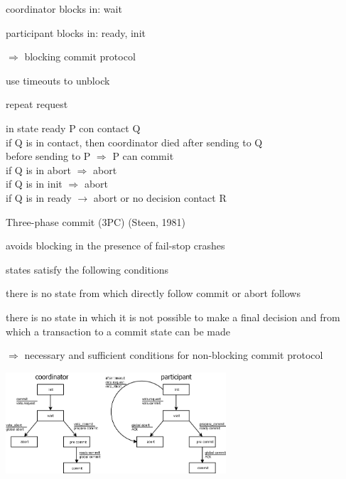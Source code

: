 \begin{compactitem}
\begin{compactitem}
	\begin{compactitem}
		\item coordinator blocks in: wait
		\item participant blocks in: ready, init
	\end{compactitem}
	$\Rightarrow$ blocking commit protocol
	\item use timeouts to unblock
	\item repeat request
	\item in state ready P con contact Q\\
	if Q is in contact, then coordinator died after sending to Q\\
	before sending to P $\Rightarrow$ P can commit\\
	if Q is in abort $\Rightarrow$ abort\\
	if Q is in init $\Rightarrow$ abort\\
	if Q is in ready $\rightarrow$ abort or no decision contact R\\
	\end{compactitem}
	\item Three-phase commit (3PC) (Steen, 1981)\\
	\begin{compactitem}
		\item avoids blocking in the presence of fail-stop crashes
		\item states satisfy the following conditions\\
		\begin{compactenum}
			\item there is no state from which directly follow commit or abort follows
			\item there is no state in which it is not possible to make a final decision and from which a transaction to a commit state can be made
		\end{compactenum}
		$\Rightarrow$ necessary and sufficient conditions for non-blocking commit protocol\\
			\begin{minipage}{\linewidth}
			\centering\includegraphics[width=310px]{gfx/3pc.png}

\end{minipage}
\end{compactitem}
\end{compactitem}
